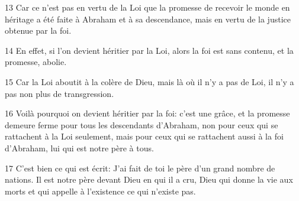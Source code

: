 
13 Car ce n’est pas en vertu de la Loi que la promesse de recevoir le monde en héritage a été faite à Abraham et à sa descendance, mais en vertu de la justice obtenue par la foi.

14 En effet, si l’on devient héritier par la Loi, alors la foi est sans contenu, et la promesse, abolie.

15 Car la Loi aboutit à la colère de Dieu, mais là où il n’y a pas de Loi, il n’y a pas non plus de transgression.

16 Voilà pourquoi on devient héritier par la foi: c’est une grâce, et la promesse demeure ferme pour tous les descendants d’Abraham, non pour ceux qui se rattachent à la Loi seulement, mais pour ceux qui se rattachent aussi à la foi d’Abraham, lui qui est notre père à tous.

17 C’est bien ce qui est écrit: J’ai fait de toi le père d’un grand nombre de nations. Il est notre père devant Dieu en qui il a cru, Dieu qui donne la vie aux morts et qui appelle à l’existence ce qui n’existe pas.